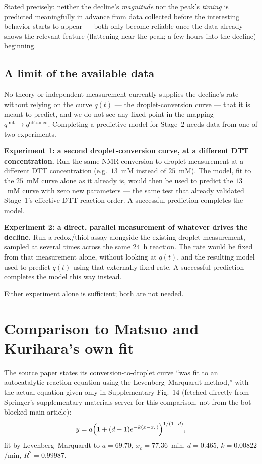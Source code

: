\documentclass[11pt]{article}
\begin{document}
Stated precisely: neither the decline's \emph{magnitude} nor the peak's \emph{timing} is
predicted meaningfully in advance from data collected before the interesting behavior starts to
appear --- both only become reliable once the data already shows the relevant feature
(flattening near the peak; a few hours into the decline) beginning.

\subsection{A limit of the available data}
\label{sec:structural-limit}

No theory or independent measurement currently supplies the decline's rate without relying on
the curve $q(t)$ --- the droplet-conversion curve --- that it is meant to predict, and we do
not see any fixed point in the mapping $q^{\text{init}} \to q^{\text{obtained}}$. Completing
a predictive model for Stage~2 needs data from one of two experiments.

\textbf{Experiment 1: a second droplet-conversion curve, at a different DTT concentration.}
Run the same NMR conversion-to-droplet measurement at a different DTT concentration (e.g.\
$13$~mM instead of $25$~mM). The model, fit to the $25$~mM curve alone as it already is, would
then be used to predict the $13$~mM curve with zero new parameters --- the same test that
already validated Stage~1's effective DTT reaction order. A successful prediction completes the
model.

\textbf{Experiment 2: a direct, parallel measurement of whatever drives the decline.} Run a
redox/thiol assay alongside the existing droplet measurement, sampled at several times across
the same $24$~h reaction. The rate would be fixed from that measurement alone, without looking
at $q(t)$, and the resulting model used to predict $q(t)$ using that externally-fixed rate. A
successful prediction completes the model this way instead.

Either experiment alone is sufficient; both are not needed.

\section{Comparison to Matsuo and Kurihara's own fit}
\label{sec:comparison}

The source paper states its conversion-to-droplet curve ``was fit to an autocatalytic
reaction equation using the Levenberg--Marquardt method,'' with the actual equation given
only in Supplementary Fig.~14 (fetched directly from Springer's supplementary-materials
server for this comparison, not from the bot-blocked main article):
\begin{equation}
y = a\Bigl(1+(d-1)e^{-k(x-x_c)}\Bigr)^{1/(1-d)},
\label{eq:matsuo-fit}
\end{equation}
fit by Levenberg--Marquardt to $a=69.70$, $x_c=77.36$~min, $d=0.465$, $k=0.00822$/min,
$R^2=0.99987$.
\end{document}
